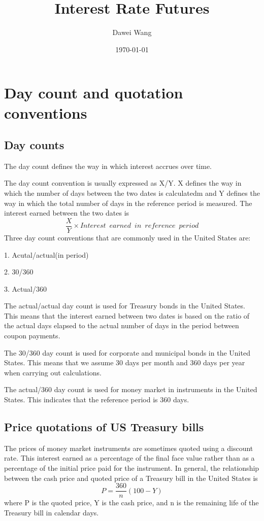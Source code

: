 \documentclass{article}
\title{Interest Rate Futures}
\author{Dawei Wang}
\date{\today}
\begin{document}
	\maketitle
\section{Day count and quotation conventions}
\subsection{Day counts}
The day count defines the way in which interest accrues over time.

The day count convention is usually expressed as X/Y. X defines the way in which the number of days between the two dates is calculatedm and Y defines the way in which the total number of days in the reference period is measured. The interest earned between the two dates is
\[
\frac{X}{Y}\times Interest\enspace earned\enspace in\enspace reference\enspace period 
\]
Three day count conventions that are commonly used in the United States are:

1. Acutal/actual(in period)

2. 30/360

3. Actual/360

The actual/actual day count is used for Treasury bonds in the United States. This means that the interest earned between two dates is based on the ratio of the actual days elapsed to the actual number of days in the period between coupon payments. 

The 30/360 day count is used for corporate and municipal bonds in the United States. This means that we assume 30 days per month and 360 days per year when carrying out calculations. 

The actual/360 day count is used for money market in instruments in the United States. This indicates that the reference period is 360 days.

\subsection{Price quotations of US Treasury bills}
The prices of money market instruments are sometimes quoted using a discount rate. This interest earned as a percentage of the final face value rather than as a percentage of the initial price paid for the instrument.
In general, the relationship between the cash price and quoted price of a Treasury bill in the United States is
\[
P=\frac{360}{n}(100-Y)
\]
where P is the quoted price, Y is the cash price, and n is the remaining life of the Treasury bill in calendar days.
\end{document}

